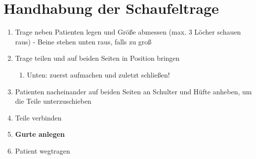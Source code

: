 \chapter{Handhabung der Schaufeltrage}
\begin{enumerate}
    \item Trage neben Patienten legen und Größe abmessen (max. 3 Löcher schauen raus) - Beine stehen unten raus, falls zu groß
    \item Trage teilen und auf beiden Seiten in Position bringen
    \begin{enumerate}
        \item Unten: zuerst aufmachen und zuletzt schließen!
    \end{enumerate}
    \item Patienten nacheinander auf beiden Seiten an Schulter und Hüfte anheben, um die Teile unterzuschieben
    \item Teile verbinden
    \item \textbf{Gurte anlegen}
    \item Patient wegtragen
\end{enumerate}